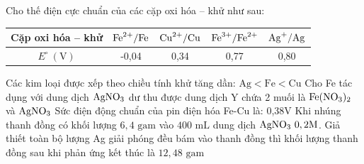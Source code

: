 \documentclass[11pt,a4paper]{article}
\begin{document}
\begin{ex}
Cho thế điện cực chuẩn của các cặp oxi hóa -- khử như sau:
\begin{center}
\renewcommand{\arraystretch}{1.2}
\begin{tabular}{|c|c|c|c|c|}
\hline
\rowcolor{tableGreen}
\textbf{Cặp oxi hóa -- khử} & $\ce{Fe^2+}/\ce{Fe}$ & $\ce{Cu^2+}/\ce{Cu}$ & $\ce{Fe^3+}/\ce{Fe^2+}$ & $\ce{Ag+}/\ce{Ag}$ \\
\hline
$E^\circ\ (\text{V})$ & -0,04 & 0,34 & 0,77 & 0,80 \\
\hline
\end{tabular}
\end{center}
\choiceTF
{Các kim loại được xếp theo chiều tính khử tăng dần: $\text{Ag} < \text{Fe} < \text{Cu}$}
{Cho Fe tác dụng với dung dịch $\ce{AgNO3}$ dư thu được dung dịch Y chứa 2 muối là $\ce{Fe(NO3)2}$ và $\ce{AgNO3}$}
{\True Sức điện động chuẩn của pin điện hóa Fe-Cu là: 0,38V}
{\True Khi nhúng thanh đồng có khối lượng $6,4\text{ gam}$ vào $400\text{ mL}$ dung dịch $\ce{AgNO3}\ 0,2\text{M}$. Giả thiết toàn bộ lượng Ag giải phóng đều bám vào thanh đồng thì khối lượng thanh đồng sau khi phản ứng kết thúc là $12,48\text{ gam}$}

\end{ex}
\end{document}
